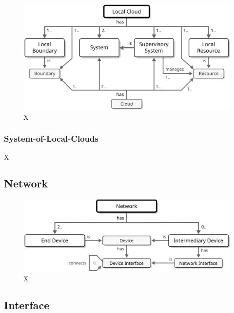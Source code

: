 \begin{figure}[ht!]
  \centering
  \includegraphics{figures/local-cloud}
  \caption{
    X
  }
  \label{fig:local-cloud}
\end{figure}

\subsubsection{System-of-Local-Clouds}
\label{sec:reference-model:system-of-systems:system-of-local-clouds}

X

\subsection{Network}
\label{sec:reference-model:network}

\begin{figure}[ht!]
  \centering
  \includegraphics{figures/network}
  \caption{
    X
  }
  \label{fig:network}
\end{figure}

\subsection{Interface}
\label{sec:reference-model:interface}

